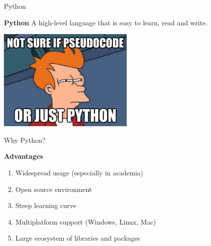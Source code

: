 \begin{frame}{Python}

    \begin{block}{\textbf{Python}}
    A high-level language that is easy to learn, read and write.
    \end{block}

    \begin{center}
	\includegraphics[width=0.5\textwidth]{01_Introduction/not_sure_meme.jpg}
    \end{center}

\end{frame}

\begin{frame}{Why Python?}

    \begin{block}{\textbf{Advantages}}
    \begin{enumerate}
        \item Widespread usage (especially in academia)
        \item Open source environment
        \item Steep learning curve
        \item Multiplatform support (Windows, Linux, Mac)
        \item Large ecosystem of libraries and packages
    \end{enumerate}
    \end{block}


\end{frame}


